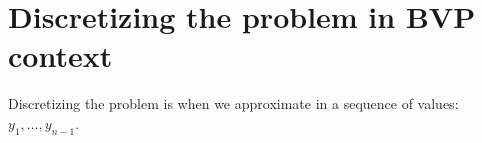 \section{Discretizing the problem in BVP context}
	Discretizing the problem is when we approximate in a sequence of values: $y_{1}, \dots, y_{n-1}$.
